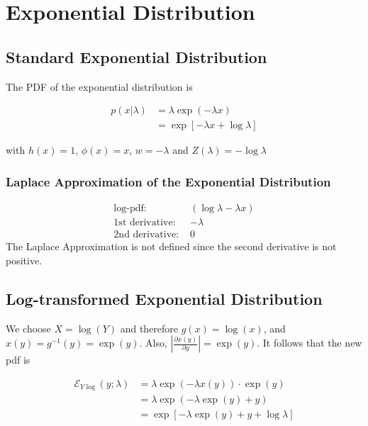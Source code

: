 \section{Exponential Distribution}

\subsection{Standard Exponential Distribution}

The PDF of the exponential distribution is

\begin{subequations}
\begin{align}
	p(x| \lambda) &= \lambda \exp(-\lambda x)
	\label{eq:exponential_pdf} \\
	 &= \exp\left[-\lambda x + \log\lambda\right]
\end{align}
\end{subequations}

with $h(x) = 1$, $\phi(x)=x$, $w = -\lambda$ and $Z(\lambda) = -\log\lambda$

\subsubsection{Laplace Approximation of the Exponential Distribution}

\begin{align*}
\text{log-pdf: } &\left( \log \lambda - \lambda x\right) \\
\text{1st derivative: }& - \lambda \\
\text{2nd derivative: }& 0
\end{align*}
The Laplace Approximation is not defined since the second derivative is not positive. 

\subsection{Log-transformed Exponential Distribution}

We choose $X = \log(Y)$ and therefore $g(x) = \log(x)$, and $x(y) = g^{-1}(y) = \exp(y)$. Also, $\left\vert \frac{\partial x(y)}{\partial y}\right\vert = \exp(y)$. It follows that the new pdf is 

\begin{subequations}
\begin{align}
	\mathcal{E}_{Y\log}(y; \lambda) &= \lambda \exp(-\lambda x(y)) \cdot \exp(y) \\ 
	&= \lambda \exp(-\lambda \exp(y) + y) \\
	&=  \exp\left[-\lambda \exp(y) + y + \log\lambda\right]
\end{align}
\end{subequations}


